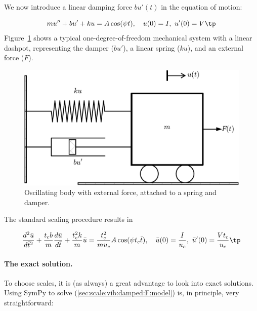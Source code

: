 \documentclass[graybox,envcountchap,sectrefs,final]{svmonodo}
\begin{document}
We now introduce a linear damping force $bu'(t)$ in the equation of motion:

\begin{equation}
mu'' + bu' + ku = A\cos(\psi t),\quad u(0)=I,\ u'(0)=V\tp
\label{sec:scale:vib:damped:F:model}
\end{equation}
Figure~\ref{sec:scale:vib:damped:sketch} shows a typical
one-degree-of-freedom mechanical system with a linear dashpot, representing
the damper ($bu'$), a linear spring ($ku$), and an external force ($F$).


\begin{figure}[!ht]  %
  \centerline{\includegraphics[width=0.6\linewidth]{fig-scaling/oscillator.pdf}}
  \caption{
  Oscillating body with external force, attached to a spring and damper. \label{sec:scale:vib:damped:sketch}
  }
\end{figure}


The standard scaling procedure results in

\begin{equation}
\frac{d^2\bar u}{d\bar t^2} + \frac{t_c b}{m}\frac{d\bar u}{d\bar t}
+ \frac{t_c^2 k}{m}\bar u =
\frac{t_c^2}{mu_c}A\cos(\psi t_c\bar t),
\quad \bar u(0)=\frac{I}{u_c},\ \bar u'(0)=\frac{Vt_c}{u_c}\tp
\label{sec:scale:vib:damped:F:model:scaled0}
\end{equation}

\paragraph{The exact solution.}
To choose scales, it is (as always)
a great advantage to look into exact solutions.
Using SymPy to solve (\ref{sec:scale:vib:damped:F:model}) is, in principle,
very straightforward:
\end{document}
